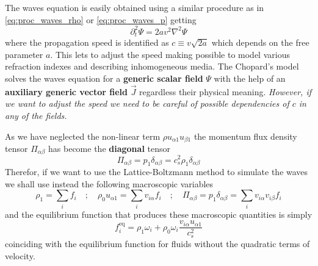 The waves equation is easily obtained using a similar procedure as in \ref{eq:proc_waves_rho} or \ref{eq:proc_waves_p} getting
\begin{equation}
    \partial_t^2\Psi = 2av^2\nabla^2\Psi
\end{equation}
where the propagation speed is identified as $c\equiv v\sqrt{2a}$ which depends on the free parameter $a$. This lets to adjust the speed making possible to model various refraction indexes and describing inhomogeneous media. 
The Chopard's model solves the waves equation for a \textbf{generic scalar field} $\Psi$ with the help of an \textbf{auxiliary generic vector field} $\vec J$ regardless their physical meaning. \textit{However, if we want to adjust the speed we need to be careful of possible dependencies of $c$ in any of the fields.} 

As we have neglected the non-linear term $\rho u_{\alpha1}u_{\beta1}$ the momentum flux density tensor $\Pi_{\alpha\beta}$ has become the \textbf{diagonal} tensor
\begin{equation}
    \Pi_{\alpha\beta} = p_1\delta_{\alpha\beta} = c_s^2\rho_1\delta_{\alpha\beta}
\end{equation}
Therefor, if we want to use the Lattice-Boltzmann method to simulate the waves we shall use instead the following macroscopic variables
\begin{equation}
    \rho_1 = \sum_i f_i \quad;\quad \rho_0 u_{\alpha1} = \sum_i v_{i\alpha}f_i  \quad;\quad \Pi_{\alpha\beta} = p_1\delta_{\alpha\beta} = \sum_i v_{i\alpha}v_{i\beta}f_i
\end{equation}
and the equilibrium function that produces these macroscopic quantities is simply
\begin{equation}\label{eq:eq_function_waves_from_fluids}
    f_i^{\text{eq}} = \rho_1\omega_i + \rho_0\omega_i\frac{v_{i\alpha}u_{\alpha1}}{c_s^2}
\end{equation}
coinciding with the equilibrium function for fluids without the quadratic terms of velocity. 

